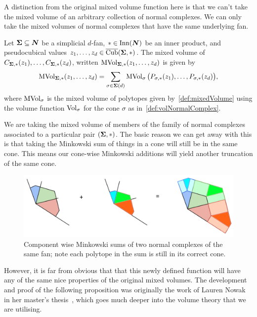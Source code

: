 \documentclass[12pt,oneside]{../../sfsuthesis}
\begin{document}
A distinction from the original mixed volume function here is that we can't take the mixed volume of an arbitrary collection of normal complexes.
We can only take the mixed volumes of normal complexes that have the same underlying fan.

\begin{definition}\th\label{def:mixedVolNormalComplex}
    Let \( {\bm{\Sigma}} \subseteq \bm{N} \) be a simplicial \( d \)-fan, \( \ast \in \operatorname{Inn}(\bm{N}) \) be an inner product, and pseudocubical values \( z_1, \dots, z_d \in \operatorname{\overline{Cub}}({\bm{\Sigma}}, \ast)\).
    The mixed volume of \( C_{{\bm{\Sigma}}, \ast}(z_1), \dots, C_{{\bm{\Sigma}}, \ast}(z_d) \), written \( \operatorname{MVol}_{{\bm{\Sigma}}, \ast}(z_1, \dots, z_d ) \) is given by
    \[
        \operatorname{MVol}_{{\bm{\Sigma}}, \ast}(z_1, \dots, z_d ) = \sum_{\sigma \in {\bm{\Sigma}}(d)} \operatorname{MVol}_\sigma\big(P_{\sigma, \ast}(z_1), \dots, P_{\sigma, \ast}(z_d)\big),
    \]
    where \( \operatorname{MVol}_\sigma \) is the mixed volume of polytopes given by~\th\ref{def:mixedVolume} using the volume function \( \operatorname{Vol}_\sigma \) for the cone \( \sigma \) as in~\th\ref{def:volNormalComplex}.
\end{definition}
We are taking the mixed volume of members of the family of normal complexes associated to a particular pair \( ({\bm{\Sigma}}, \ast) \).
The basic reason we can get away with this is that taking the Minkowski sum of things in a cone will still be in the same cone.
This means our cone-wise Minkowski additions will yield another truncation of the same cone.
\begin{figure}[H]
    \centering
    \includegraphics[width=1.05\textwidth]{./images/mvol_ex}
    \caption{Component wise Minkowski sums of two normal complexes of the same fan; note each polytope in the sum is still in its correct cone.}
\end{figure}
However, it is far from obvious that that this newly defined function will have any of the same nice properties of the original mixed volumes.
The development and proof of the following proposition was originally the work of Lauren Nowak in her master's thesis~\cite{nowakMixedVolumesNormal2022}, which goes much deeper into the volume theory that we are utilising.
\end{document}
